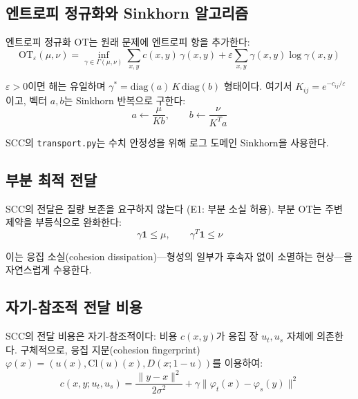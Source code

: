 \subsection{엔트로피 정규화와 Sinkhorn 알고리즘}

엔트로피 정규화 OT는 원래 문제에 엔트로피 항을 추가한다:
\begin{equation}
    \mathrm{OT}_\varepsilon(\mu, \nu) = \inf_{\gamma \in \Gamma(\mu,\nu)} \sum_{x,y} c(x,y)\, \gamma(x,y) + \varepsilon \sum_{x,y} \gamma(x,y) \log \gamma(x,y)
    \label{eq:sinkhorn-ot}
\end{equation}

$\varepsilon > 0$이면 해는 유일하며 $\gamma^* = \mathrm{diag}(a)\, K\, \mathrm{diag}(b)$ 형태이다. 여기서 $K_{ij} = e^{-c_{ij}/\varepsilon}$이고, 벡터 $a, b$는 Sinkhorn 반복으로 구한다:
\begin{equation}
    a \leftarrow \frac{\mu}{Kb}, \qquad b \leftarrow \frac{\nu}{K^T a}
    \label{eq:sinkhorn-iteration}
\end{equation}

SCC의 \texttt{transport.py}는 수치 안정성을 위해 로그 도메인 Sinkhorn을 사용한다.


\subsection{부분 최적 전달}

SCC의 전달은 질량 보존을 요구하지 않는다 (E1: 부분 소실 허용). 부분 OT는 주변 제약을 부등식으로 완화한다:
\begin{equation}
    \gamma \mathbf{1} \leq \mu, \qquad \gamma^T \mathbf{1} \leq \nu
    \label{eq:partial-ot}
\end{equation}

이는 응집 소실(cohesion dissipation)---형성의 일부가 후속자 없이 소멸하는 현상---을 자연스럽게 수용한다.


\subsection{자기-참조적 전달 비용}

SCC의 전달 비용은 자기-참조적이다: 비용 $c(x,y)$가 응집 장 $u_t, u_s$ 자체에 의존한다. 구체적으로, 응집 지문(cohesion fingerprint) $\varphi(x) = (u(x), \mathrm{Cl}(u)(x), D(x; 1{-}u))$를 이용하여:
\begin{equation}
    c(x,y; u_t, u_s) = \frac{\|y - x\|^2}{2\sigma^2} + \gamma \|\varphi_t(x) - \varphi_s(y)\|^2
    \label{eq:self-referential-cost}
\end{equation}

